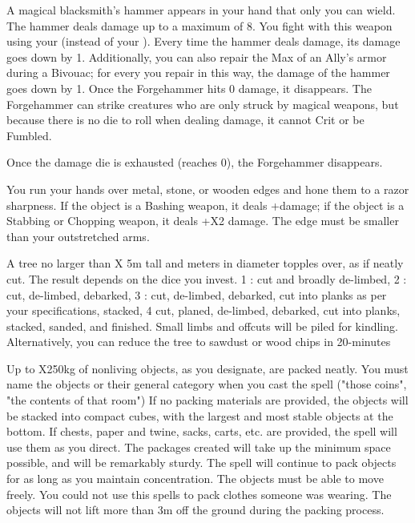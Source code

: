 {A magical blacksmith's hammer appears in your hand that only you can wield.  The hammer deals \DICE damage up to a maximum of 8. You fight with this weapon using your \FOC (instead of your \VIG).  Every time the hammer deals damage, its damage goes down by 1.   Additionally, you can also repair the Max \UD of an Ally's armor during a Bivouac; for every \DCUP you repair in this way, the damage of the hammer goes down by 1.  Once the Forgehammer hits 0 damage, it disappears. The Forgehammer can strike creatures who are only struck by magical weapons, but because there is no die to roll when dealing damage, it cannot Crit or be Fumbled.

Once the damage die is exhausted (reaches 0), the Forgehammer disappears.


\MYSTERY [
  Name = Hone,
  Link = arcana-mystery-hone,
  Paradigm = Force,
  Save = N,
  Duration = Combat or \SUM Minutes,
  Target = Close Target(s)
]

You run your hands over \DICE metal, stone, or wooden edges and hone them to a razor sharpness. If the object is a Bashing weapon, it deals +\DICE damage; if the object is a Stabbing or Chopping weapon, it deals +\DICE X2 damage. The edge must be smaller than your outstretched arms.

\MYSTERY [
  Name = Millworks,
  Link = arcana-mystery-millworks,
  Paradigm = Entropy,
  Save = N,
  Duration = Instant,
  Target = Close Target(s)
]

A tree no larger than \DICE X 5m tall and \DICE meters in diameter topples over, as if neatly cut. The result depends on the dice you invest. 1 \DICE: cut and broadly de-limbed, 2 \DICE: cut, de-limbed, debarked, 3 \DICE: cut, de-limbed, debarked, cut into planks as per your specifications, stacked, 4 \DICE cut, planed, de-limbed, debarked, cut into planks, stacked, sanded, and finished. Small limbs and offcuts will be piled for kindling. Alternatively, you can reduce the tree to sawdust or wood chips in 20-\SUMDICE minutes


\MYSTERY [
  Name = Package Neatly,
  Link = arcana-mystery-package-neatly,
  Paradigm = Entropy,
  Save = n/a,
  Duration = Concentration or Permanent,
  Target = Nearby Target(s)
]

Up to \DICE X250kg of nonliving objects, as you designate, are packed neatly. You must name the objects or their general category when you cast the spell ("those coins", "the contents of that room") If no packing materials are provided, the objects will be stacked into compact cubes, with the largest and most stable objects at the bottom. If chests, paper and twine, sacks, carts, etc. are provided, the spell will use them as you direct. The packages created will take up the minimum space possible, and will be remarkably sturdy. The spell will continue to pack objects for as long as you maintain concentration. The objects must be able to move freely. You could not use this spells to pack clothes someone was wearing. The objects will not lift more than 3m off the ground during the packing process.

}
